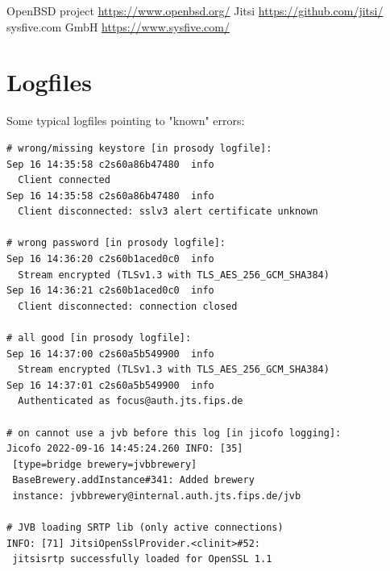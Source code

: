 \documentclass[10pt,conference]{IEEEtran}
\begin{document}
\begin{thebibliography}{00}
 OpenBSD project \url{https://www.openbsd.org/}
 Jitsi \url{https://github.com/jitsi/}
 sysfive.com GmbH \url{https://www.sysfive.com/}
\end{thebibliography}

\section{Logfiles}
Some typical logfiles pointing to "known" errors:
\begin{verbatim}
# wrong/missing keystore [in prosody logfile]:
Sep 16 14:35:58 c2s60a86b47480  info
  Client connected
Sep 16 14:35:58 c2s60a86b47480  info
  Client disconnected: sslv3 alert certificate unknown

# wrong password [in prosody logfile]:
Sep 16 14:36:20 c2s60b1aced0c0  info
  Stream encrypted (TLSv1.3 with TLS_AES_256_GCM_SHA384)
Sep 16 14:36:21 c2s60b1aced0c0  info
  Client disconnected: connection closed

# all good [in prosody logfile]:
Sep 16 14:37:00 c2s60a5b549900  info
  Stream encrypted (TLSv1.3 with TLS_AES_256_GCM_SHA384)
Sep 16 14:37:01 c2s60a5b549900  info
  Authenticated as focus@auth.jts.fips.de

# on cannot use a jvb before this log [in jicofo logging]:
Jicofo 2022-09-16 14:45:24.260 INFO: [35]
 [type=bridge brewery=jvbbrewery]
 BaseBrewery.addInstance#341: Added brewery
 instance: jvbbrewery@internal.auth.jts.fips.de/jvb

# JVB loading SRTP lib (only active connections)
INFO: [71] JitsiOpenSslProvider.<clinit>#52:
 jitsisrtp successfully loaded for OpenSSL 1.1
\end{verbatim}
\end{document}
